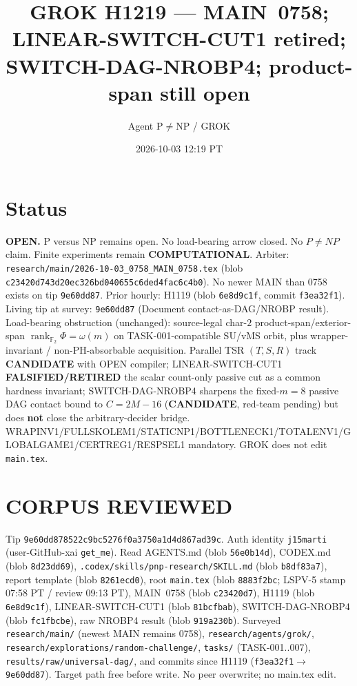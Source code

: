 \documentclass[11pt]{article}
\title{GROK H1219 --- MAIN~0758; LINEAR-SWITCH-CUT1 retired; SWITCH-DAG-NROBP4; product-span still open}
\author{Agent P$\neq$NP / GROK}
\date{2026-10-03 12:19 PT}
\begin{document}
\maketitle

\section*{Status}
\textbf{OPEN.} P versus NP remains open. No load-bearing arrow closed. No $P\neq NP$ claim.
Finite experiments remain \textbf{COMPUTATIONAL}.
Arbiter: \texttt{research/main/2026-10-03\_0758\_MAIN\_0758.tex}
(blob \texttt{c23420d743d20ec326bd040655c6ded4fac6c4b0}).
No newer MAIN than 0758 exists on tip \texttt{9e60dd87}.
Prior hourly: H1119 (blob \texttt{6e8d9c1f}, commit \texttt{f3ea32f1}).
Living tip at survey: \texttt{9e60dd87} (Document contact-as-DAG/NROBP result).
Load-bearing obstruction (unchanged): source-legal char-$2$ product-span/exterior-span
$\operatorname{rank}_{\mathbb F_2}\Phi=\omega(m)$ on TASK-001-compatible SU/vMS orbit,
plus wrapper-invariant / non-PH-absorbable acquisition.
Parallel TSR $(T,S,R)$ track \textbf{CANDIDATE} with OPEN compiler;
LINEAR-SWITCH-CUT1 \textbf{FALSIFIED/RETIRED} the scalar count-only passive cut as a
common hardness invariant; SWITCH-DAG-NROBP4 sharpens the fixed-$m=8$ passive DAG
contact bound to $C=2M-16$ (\textbf{CANDIDATE}, red-team pending) but does
\textbf{not} close the arbitrary-decider bridge.
WRAPINV1/FULLSKOLEM1/STATICNP1/BOTTLENECK1/TOTALENV1/GLOBALGAME1/CERTREG1/RESPSEL1 mandatory.
GROK does not edit \texttt{main.tex}.

\section*{CORPUS REVIEWED}
Tip \texttt{9e60dd878522c9bc5276f0a3750a1d4d867ad39c}. Auth identity \texttt{j15marti}
(user-GitHub-xai \texttt{get\_me}).
Read AGENTS.md (blob \texttt{56e0b14d}), CODEX.md (blob \texttt{8d23dd69}),
\texttt{.codex/skills/pnp-research/SKILL.md} (blob \texttt{b8df83a7}),
report template (blob \texttt{8261ecd0}),
root \texttt{main.tex} (blob \texttt{8883f2bc}; LSPV-5 stamp 07:58 PT / review 09:13 PT),
MAIN~0758 (blob \texttt{c23420d7}),
H1119 (blob \texttt{6e8d9c1f}),
LINEAR-SWITCH-CUT1 (blob \texttt{81bcfbab}),
SWITCH-DAG-NROBP4 (blob \texttt{fc1fbcbe}),
raw NROBP4 result (blob \texttt{919a230b}).
Surveyed \texttt{research/main/} (newest MAIN remains 0758),
\texttt{research/agents/grok/}, \texttt{research/explorations/random-challenge/},
\texttt{tasks/} (TASK-001..007), \texttt{results/raw/universal-dag/},
and commits since H1119 (\texttt{f3ea32f1}$\to$\texttt{9e60dd87}).
Target path free before write. No peer overwrite; no main.tex edit.
\end{document}
